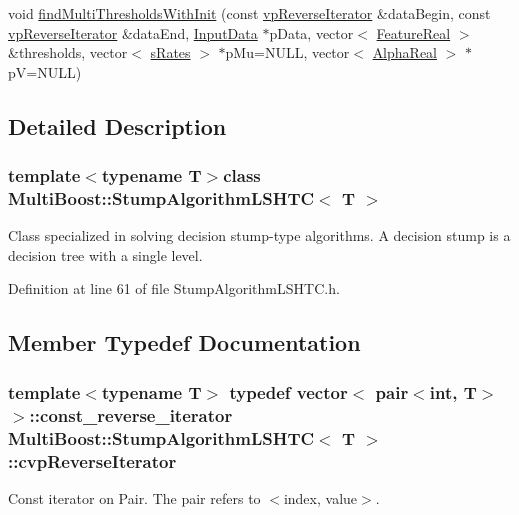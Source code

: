 \begin{DoxyCompactItemize}
\item 
void \hyperlink{classMultiBoost_1_1StumpAlgorithmLSHTC_abda2f26794606ccaa90c90b23504ce65}{find\-Multi\-Thresholds\-With\-Init} (const \hyperlink{classMultiBoost_1_1StumpAlgorithmLSHTC_afb453a312f66e27f2c3a87127b113e58}{vp\-Reverse\-Iterator} \&data\-Begin, const \hyperlink{classMultiBoost_1_1StumpAlgorithmLSHTC_afb453a312f66e27f2c3a87127b113e58}{vp\-Reverse\-Iterator} \&data\-End, \hyperlink{classMultiBoost_1_1InputData}{Input\-Data} $\ast$p\-Data, vector$<$ \hyperlink{Defaults_8h_a3a11cfe6a5d469d921716ca6291e934f}{Feature\-Real} $>$ \&thresholds, vector$<$ \hyperlink{structMultiBoost_1_1sRates}{s\-Rates} $>$ $\ast$p\-Mu=N\-U\-L\-L, vector$<$ \hyperlink{Defaults_8h_a80184c4fd10ab70a1a17c5f97dcd1563}{Alpha\-Real} $>$ $\ast$p\-V=N\-U\-L\-L)
\end{DoxyCompactItemize}


\subsection{Detailed Description}
\subsubsection*{template$<$typename T$>$class Multi\-Boost\-::\-Stump\-Algorithm\-L\-S\-H\-T\-C$<$ T $>$}

Class specialized in solving decision stump-\/type algorithms. A decision stump is a decision tree with a single level. 

Definition at line 61 of file Stump\-Algorithm\-L\-S\-H\-T\-C.\-h.



\subsection{Member Typedef Documentation}
\hypertarget{classMultiBoost_1_1StumpAlgorithmLSHTC_a22cfd687a3bcfcde844a07a793ec7230}{
\subsubsection[{cvp\-Reverse\-Iterator}]{\setlength{\rightskip}{0pt plus 5cm}template$<$typename T$>$ typedef vector$<$ pair$<$int, T$>$ $>$\-::const\-\_\-reverse\-\_\-iterator {\bf Multi\-Boost\-::\-Stump\-Algorithm\-L\-S\-H\-T\-C}$<$ T $>$\-::{\bf cvp\-Reverse\-Iterator}}}\label{classMultiBoost_1_1StumpAlgorithmLSHTC_a22cfd687a3bcfcde844a07a793ec7230}
Const iterator on Pair. The pair refers to $<$index, value$>$. 

